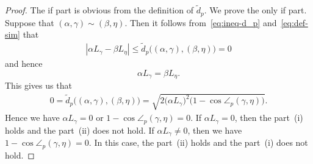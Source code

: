 \documentclass[draft]{amsart}
\numberwithin{equation}{section}
\providecommand{\abs}[1]{\left\lvert#1\right\rvert}
\theoremstyle{plain}
\theoremstyle{definition}
\theoremstyle{remark}
\begin{document}
\begin{proof}
 The if part is obvious from the definition of $\tilde{d}_p$. 
 We prove the only if part. Suppose that $(\alpha, \gamma)\sim (\beta, \eta)$. Then it follows from~\eqref{eq:ineq-d_p} 
 and~\eqref{eq:def-sim} that 
 \begin{align*}
   \abs{\alpha L_{\gamma} - \beta L_{\eta}} 
   \leq \tilde{d}_p\bigl((\alpha, \gamma), (\beta, \eta)\bigr) =0
 \end{align*}
 and hence 
 \[
  \alpha L_{\gamma} = \beta L_{\eta}. 
 \] 
 This gives us that 
 \begin{align*}
  0 = \tilde{d}_p\bigl((\alpha, \gamma), (\beta, \eta)\bigr)
    =\sqrt{2\bigl(\alpha L_{\gamma}\bigr)^2 \bigl(1-\cos \angle_p(\gamma, \eta)\bigr)}.
 \end{align*} 
 Hence we have $\alpha L_{\gamma}=0$ or 
 $1-\cos \angle_p(\gamma, \eta)=0$. 
 If $\alpha L_{\gamma} = 0$, then the part~(i) holds 
 and the part~(ii) does not hold. 
 If $\alpha L_{\gamma} \neq 0$, then 
 we have $1-\cos \angle_p(\gamma, \eta)=0$. 
 In this case, the part~(ii) holds 
 and the part~(i) does not hold. 
\end{proof}
\end{document}

